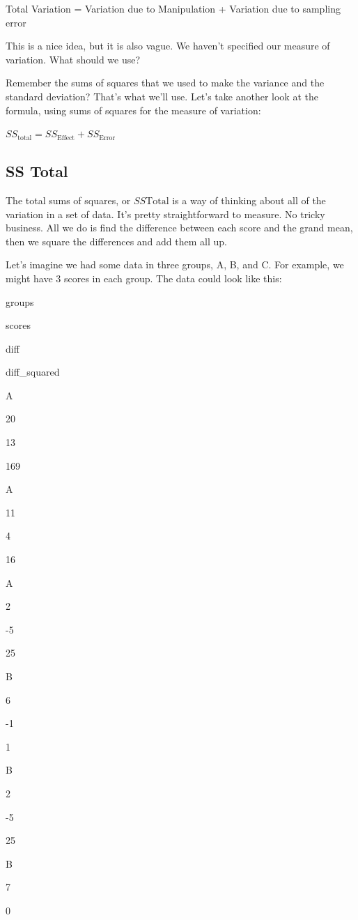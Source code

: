 \documentclass[]{book}
\begin{document}
Total Variation = Variation due to Manipulation + Variation due to sampling error

This is a nice idea, but it is also vague. We haven't specified our measure of variation. What should we use?

Remember the sums of squares that we used to make the variance and the standard deviation? That's what we'll use. Let's take another look at the formula, using sums of squares for the measure of variation:

\(SS_\text{total} = SS_\text{Effect} + SS_\text{Error}\)

\hypertarget{ss-total}{%
\subsection{SS Total}\label{ss-total}}

The total sums of squares, or \(SS\text{Total}\) is a way of thinking about all of the variation in a set of data. It's pretty straightforward to measure. No tricky business. All we do is find the difference between each score and the grand mean, then we square the differences and add them all up.

Let's imagine we had some data in three groups, A, B, and C. For example, we might have 3 scores in each group. The data could look like this:

groups

scores

diff

diff\_squared

A

20

13

169

A

11

4

16

A

2

-5

25

B

6

-1

1

B

2

-5

25

B

7

0
\end{document}
